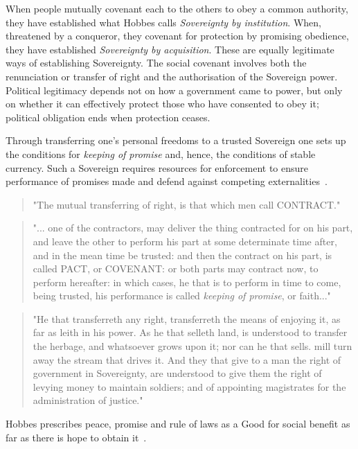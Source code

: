 \documentclass[11pt, oneside]{book}   	%
\begin{document}
When people mutually covenant each to the others to obey a common authority, they have established what Hobbes calls \emph{Sovereignty by institution}. When, threatened by a conqueror, they covenant for protection by promising obedience, they have established \emph{Sovereignty by acquisition}. These are equally legitimate ways of establishing Sovereignty. The social covenant involves both the renunciation or transfer of right and the authorisation of the Sovereign power. Political legitimacy depends not on how a government came to power, but only on whether it can effectively protect those who have consented to obey it; political obligation ends when protection ceases.\par

Through transferring one's personal freedoms to a trusted Sovereign one sets up the conditions for \emph{keeping of promise} and, hence, the conditions of stable currency. Such a Sovereign requires resources for enforcement to ensure performance of promises made and defend against competing externalities~\cite{th1}.

\begin{quote}
"The mutual transferring of right, is that which men call CONTRACT."
\end{quote}
\begin{quote}
"... one of the contractors, may deliver the thing contracted for on his part, and leave the other to perform his part at some determinate time after, and in the mean time be trusted: and then the contract on his part, is called PACT, or COVENANT: or both parts may contract now, to perform hereafter: in which cases, he that is to perform in time to come, being trusted, his performance is called \emph{keeping of promise}, or faith..."
\end{quote}

\begin{quote}
"He that transferreth any right, transferreth the means of enjoying it, as far as leith in his power. As he that selleth land, is understood to transfer the herbage, and whatsoever grows upon it; nor can he that sells. mill turn away the stream that drives it. And they that give to a man the right of government in Sovereignty, are understood to give them the right of levying money to maintain soldiers; and of appointing magistrates for the administration of justice."
\end{quote}

Hobbes prescribes peace, promise and rule of laws as a Good for social benefit as far as there is hope to obtain it~\cite{th1}.
\end{document}

